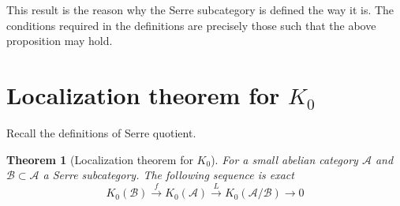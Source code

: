 \documentclass[12pt]{report}
\numberwithin{equation}{section}
\newtheorem{theorem}[dummy]{Theorem}
\begin{document}
	This result is the reason why the Serre subcategory is defined the way it is. The conditions required in the definitions are precisely those such that the above proposition may hold.
	
	

		
	\section{Localization theorem for $K_0$}\label{Localizationk0}
	Recall the definitions of Serre quotient.
	\begin{theorem}[Localization theorem for $K_0$]
		 For a small abelian category $\mathcal{A}$ and $\mathcal{B} \subset \mathcal{A}$ a Serre subcategory. The following sequence is exact
		 \[ K_0(\mathcal{B}) \xrightarrow{f} K_0(\mathcal{A}) \xrightarrow{L} K_0(\mathcal{A/B}) \to 0 \]
	\end{theorem}
\end{document}
